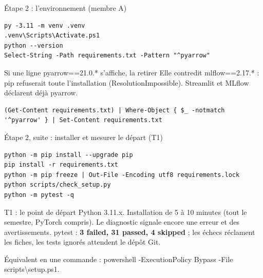 \documentclass[aspectratio=169,11pt]{beamer}
\newcommand{\co}[1]{{\ttfamily\hyphenchar\font=45\relax #1}}
\newcommand{\bs}{\textbackslash\allowbreak{}}
\begin{document}
\begin{frame}[fragile]{Étape 2 : l'environnement (membre A)}
\begin{lstlisting}
py -3.11 -m venv .venv
.venv\Scripts\Activate.ps1
python --version
Select-String -Path requirements.txt -Pattern "^pyarrow"
\end{lstlisting}
\begin{alertblock}{Si une ligne pyarrow==21.0.* s'affiche, la retirer}
Elle contredit \co{mlflow==2.17.*} : pip refuserait toute l'installation (\co{ResolutionImpossible}).
Streamlit et MLflow déclarent déjà pyarrow.
\end{alertblock}
\begin{lstlisting}
(Get-Content requirements.txt) | Where-Object { $_ -notmatch '^pyarrow' } | Set-Content requirements.txt
\end{lstlisting}
\end{frame}

\begin{frame}[fragile]{Étape 2, suite : installer et mesurer le départ (T1)}
\begin{lstlisting}
python -m pip install --upgrade pip
pip install -r requirements.txt
python -m pip freeze | Out-File -Encoding utf8 requirements.lock
python scripts/check_setup.py
python -m pytest -q
\end{lstlisting}
\begin{exampleblock}{T1 : le point de départ}
\co{Python 3.11.x}. Installation de 5 à 10 minutes (tout le semestre, PyTorch compris). Le diagnostic signale
encore une erreur et des avertissements. pytest : \textbf{3 failed, 31 passed, 4 skipped} ; les échecs
réclament les fiches, les tests ignorés attendent le dépôt Git.
\end{exampleblock}
\small Équivalent en une commande : \co{powershell -ExecutionPolicy Bypass -File scripts\bs setup.ps1}.
\end{frame}
\end{document}
